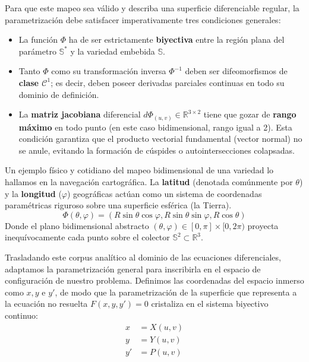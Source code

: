Para que este mapeo sea válido y describa una superficie diferenciable regular, la parametrización debe satisfacer imperativamente tres condiciones generales:
\begin{itemize}
    \item La función $\Phi$ ha de ser estrictamente \textbf{biyectiva} entre la región plana del parámetro $\mathbb{S}^*$ y la variedad embebida $\mathbb{S}$.
    \item Tanto $\Phi$ como su transformación inversa $\Phi^{-1}$ deben ser difeomorfismos de \textbf{clase $\mathcal{C}^1$}; es decir, deben poseer derivadas parciales continuas en todo su dominio de definición.
    \item La \textbf{matriz jacobiana} diferencial $d\Phi_{(u,v)} \in \mathbb{R}^{3\times 2}$ tiene que gozar de \textbf{rango máximo} en todo punto (en este caso bidimensional, rango igual a 2). Esta condición garantiza que el producto vectorial fundamental (vector normal) no se anule, evitando la formación de cúspides o autointersecciones colapsadas.
\end{itemize}

\begin{tcolorbox}[recuadro={Ejemplo analógico: coordenadas geográficas}]
Un ejemplo físico y cotidiano del mapeo bidimensional de una variedad lo hallamos en la navegación cartográfica. La \textbf{latitud} (denotada comúnmente por $\theta$) y la \textbf{longitud} ($\varphi$) geográficas actúan como un sistema de coordenadas paramétricas riguroso sobre una superficie esférica (la Tierra). 
$$ \Phi(\theta, \varphi) = (R\sin\theta\cos\varphi, R\sin\theta\sin\varphi, R\cos\theta) $$
Donde el plano bidimensional abstracto $(\theta, \varphi) \in [0, \pi] \times [0, 2\pi)$ proyecta inequívocamente cada punto sobre el colector $\mathbb{S}^2 \subset \mathbb{R}^3$.
\end{tcolorbox}

Trasladando este corpus analítico al dominio de las ecuaciones diferenciales, adaptamos la parametrización general para inscribirla en el espacio de configuración de nuestro problema. Definimos las coordenadas del espacio inmerso como $x, y$ e $y'$, de modo que la parametrización de la superficie que representa a la ecuación no resuelta $F(x,y,y') = 0$ cristaliza en el sistema biyectivo continuo:
\begin{align*}
    x &= X(u,v) \\
    y &= Y(u,v) \\
    y' &= P(u,v)
\end{align*}

